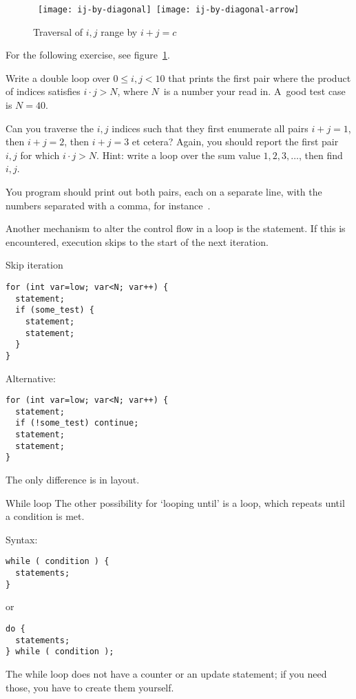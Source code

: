 
\begin{figure}[ht]
  \hbox\bgroup
  \texttt{[image: ij-by-diagonal]}
  \texttt{[image: ij-by-diagonal-arrow]}
  \egroup
  \caption{Traversal of $i,j$ range by $i+j=c$}
  \label{fig:ij-diag}
\end{figure}

For the following exercise, see figure~\ref{fig:ij-diag}.

\begin{exercise}
  \label{ex:ij-product}
  Write a double loop over $0\leq i,j<10$ that prints the first pair
  where the product of indices satisfies $i\cdot j> N$, where $N$~is a
  number your read in. A~good test case is $N=40$.

  Can you traverse the $i,j$ indices such that they first enumerate
  all pairs $i+j=1$, then $i+j=2$, then $i+j=3$ et cetera? Again, you
  should report the first pair $i,j$ for which $i\cdot j>N$. Hint:
  write a loop over the sum value $1,2,3,\ldots$, then find~$i,j$.

  You program should print out both pairs, each on a separate line,
  with the numbers separated with a comma, for instance~.
\end{exercise}

Another mechanism to alter the control flow in a loop is the
 statement. If this is encountered, execution
skips to the start of the next iteration.

\begin{block}{Skip iteration}
  \label{sl:for-cont}
\begin{verbatim}
for (int var=low; var<N; var++) {
  statement;
  if (some_test) {
    statement;
    statement;
  }
}
\end{verbatim}
Alternative:
\begin{verbatim}
for (int var=low; var<N; var++) {
  statement;
  if (!some_test) continue;
  statement;
  statement;
}
\end{verbatim}
The only difference is in layout.
\end{block}

\begin{block}{While loop}
  \label{sl:while}
  The other possibility for `looping until' is a
   loop, which repeats until a condition is met.

  Syntax:
\begin{verbatim}
while ( condition ) {
  statements;
}
\end{verbatim}
or
\begin{verbatim}
do {
  statements;
} while ( condition );
\end{verbatim}
The while loop does not have a counter or an update statement; if you
need those, you have to create them yourself.
\end{block}

